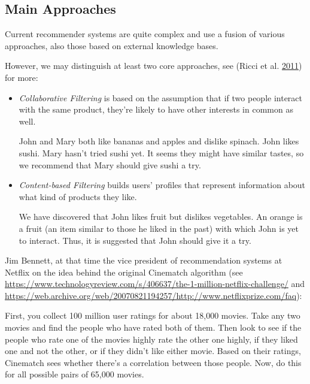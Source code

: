 \documentclass[10pt,b5paper,krantz1]{krantz}
\renewenvironment{quote}{\begin{VF}}{\end{VF}}
\begin{document}
\hypertarget{main-approaches}{%
\subsection{Main Approaches}\label{main-approaches}}

Current recommender systems are quite complex and use a fusion
of various approaches, also those based on external knowledge bases.

However, we may distinguish at least two core approaches,
see (Ricci et al. \protect\hyperlink{ref-ricci_etal}{2011}) for more:

\begin{itemize}
\item
  \emph{Collaborative Filtering} is based on the assumption that if
  two people interact with the same product,
  they're likely to have other interests in common as well.

  \begin{quote}
  John and Mary both like bananas and apples and dislike spinach. John likes
  sushi. Mary hasn't tried sushi yet. It seems they might have similar tastes,
  so we recommend that Mary should give sushi a try.
  \end{quote}
\item
  \emph{Content-based Filtering} builds users' profiles that represent information
  about what kind of products they like.

  \begin{quote}
  We have discovered that John likes fruit but dislikes vegetables.
  An orange is a fruit (an item similar to those he liked in the past)
  with which John is yet to interact. Thus, it is suggested that John should
  give it a try.
  \end{quote}
\end{itemize}

Jim Bennett, at that time the vice president of recommendation systems at Netflix
on the idea behind the original Cinematch algorithm (see \url{https://www.technologyreview.com/s/406637/the-1-million-netflix-challenge/}
and \url{https://web.archive.org/web/20070821194257/http://www.netflixprize.com/faq}):

\begin{quote}
First, you collect 100 million user ratings for about 18,000 movies. Take any two movies and find the people who have rated both of them. Then look to see if the people who rate one of the movies highly rate the other one highly, if they liked one and not the other, or if they didn't like either movie. Based on their ratings, Cinematch sees whether there's a correlation between those people. Now, do this for all possible pairs of 65,000 movies.
\end{quote}
\end{document}
